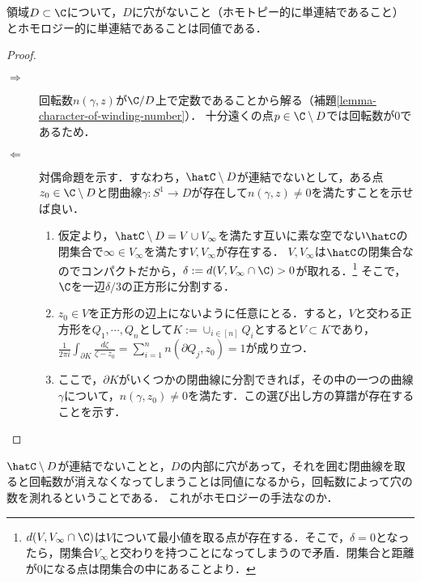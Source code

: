 \documentclass[uplatex, dvipdfmx]{jsreport}
\begin{document}
\begin{theorem}[単連結性の特徴づけの最後のピース]
    領域$D\subset\C$について，$D$に穴がないこと（ホモトピー的に単連結であること）とホモロジー的に単連結であることは同値である．
\end{theorem}
\begin{proof}\mbox{}
    \begin{description}
        \item[$\Rightarrow$] 回転数$n(\gamma,z)$が$\C/D$上で定数であることから解る（補題\ref{lemma-character-of-winding-number}）．
        十分遠くの点$p\in\C\setminus D$では回転数が$0$であるため．
        \item[$\Leftarrow$]
        対偶命題を示す．すなわち，$\hatC\setminus D$が連結でないとして，ある点$z_0\in\C\setminus D$と閉曲線$\gamma:S^1\to D$が存在して$n(\gamma,z)\ne 0$を満たすことを示せば良い．
        \begin{enumerate}
            \item 仮定より，$\hatC\setminus D=V\cup V_\infty$を満たす互いに素な空でない$\hatC$の閉集合で$\infty\in V_\infty$を満たす$V,V_\infty$が存在する．
            $V,V_\infty$は$\hatC$の閉集合なのでコンパクトだから，$\delta:=d(V,V_\infty\cap\C)>0$が取れる．\footnote{$d(V,V_\infty\cap\C)$は$V$について最小値を取る点が存在する．そこで，$\delta=0$となったら，閉集合$V_\infty$と交わりを持つことになってしまうので矛盾．閉集合と距離が$0$になる点は閉集合の中にあることより．}
            そこで，$\C$を一辺$\delta/3$の正方形に分割する．
            \item $z_0\in V$を正方形の辺上にないように任意にとる．すると，$V$と交わる正方形を$Q_1,\cdots,Q_n$として$K:=\cup_{i\in[n]}Q_i$とすると$V\subset K$であり，$\frac{1}{2\pi i}\int_{\partial K}\frac{d\zeta}{\zeta-z_0}=\sum^n_{i=1}n(\partial Q_j,z_0)=1$が成り立つ．
            \item ここで，$\partial K$がいくつかの閉曲線に分割できれば，その中の一つの曲線$\gamma$について，$n(\gamma,z_0)\ne 0$を満たす．この選び出し方の算譜が存在することを示す．
        \end{enumerate}
    \end{description}
\end{proof}
\begin{remarks}
    $\hatC\setminus D$が連結でないことと，$D$の内部に穴があって，それを囲む閉曲線を取ると回転数が消えなくなってしまうことは同値になるから，回転数によって穴の数を測れるということである．
    これがホモロジーの手法なのか．
\end{remarks}
\end{document}
